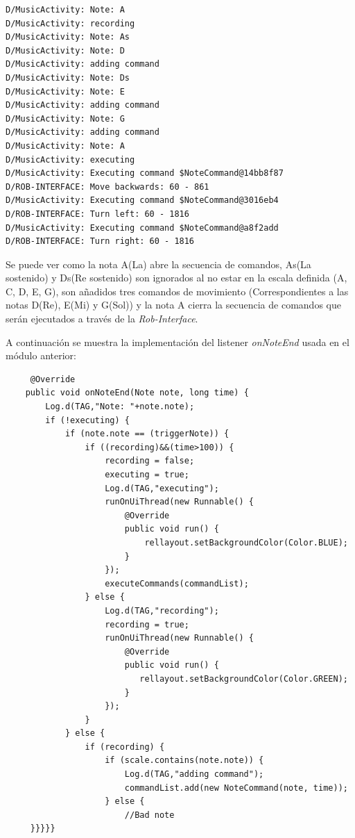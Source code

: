 \begin{verbatim}
D/MusicActivity: Note: A
D/MusicActivity: recording
D/MusicActivity: Note: As
D/MusicActivity: Note: D
D/MusicActivity: adding command
D/MusicActivity: Note: Ds
D/MusicActivity: Note: E
D/MusicActivity: adding command
D/MusicActivity: Note: G
D/MusicActivity: adding command
D/MusicActivity: Note: A
D/MusicActivity: executing
D/MusicActivity: Executing command $NoteCommand@14bb8f87
D/ROB-INTERFACE: Move backwards: 60 - 861
D/MusicActivity: Executing command $NoteCommand@3016eb4
D/ROB-INTERFACE: Turn left: 60 - 1816
D/MusicActivity: Executing command $NoteCommand@a8f2add
D/ROB-INTERFACE: Turn right: 60 - 1816
\end{verbatim} 

Se puede ver como la nota A(La) abre la secuencia de comandos, As(La sostenido) y Ds(Re sostenido) son ignorados al no estar en la escala definida (A, C, D, E, G), son añadidos tres comandos de movimiento (Correspondientes a las notas D(Re), E(Mi) y G(Sol)) y la nota A cierra la secuencia de comandos que serán ejecutados a través de la \textit{Rob-Interface}.


A continuación se muestra la implementación del listener \textit{onNoteEnd} usada en el módulo anterior:

\begin{lstlisting}
	 @Override
    public void onNoteEnd(Note note, long time) {
        Log.d(TAG,"Note: "+note.note);
        if (!executing) {
            if (note.note == (triggerNote)) {
                if ((recording)&&(time>100)) {
                    recording = false;
                    executing = true;
                    Log.d(TAG,"executing");
                    runOnUiThread(new Runnable() {
                        @Override
                        public void run() {
                            rellayout.setBackgroundColor(Color.BLUE);
                        }
                    });
                    executeCommands(commandList);
                } else {
                    Log.d(TAG,"recording");
                    recording = true;
                    runOnUiThread(new Runnable() {
                        @Override
                        public void run() {
                           rellayout.setBackgroundColor(Color.GREEN);
                        }
                    });
                }
            } else {
                if (recording) {
                    if (scale.contains(note.note)) {
                        Log.d(TAG,"adding command");
                        commandList.add(new NoteCommand(note, time));
                    } else {
                        //Bad note
     }}}}}
\end{lstlisting}



